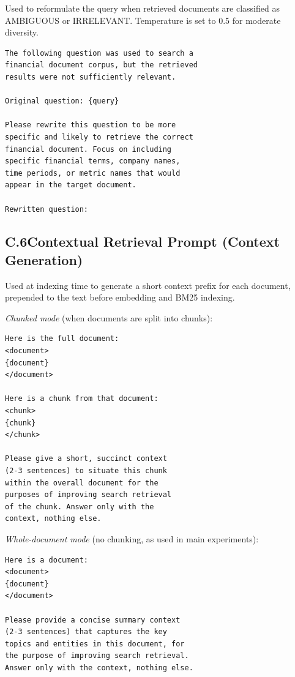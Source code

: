 \documentclass[11pt]{article}
\begin{document}
Used to reformulate the query when retrieved documents are classified as AMBIGUOUS or IRRELEVANT. Temperature is set to 0.5 for moderate diversity.

\begin{scriptsize}
\begin{verbatim}
The following question was used to search a
financial document corpus, but the retrieved
results were not sufficiently relevant.

Original question: {query}

Please rewrite this question to be more
specific and likely to retrieve the correct
financial document. Focus on including
specific financial terms, company names,
time periods, or metric names that would
appear in the target document.

Rewritten question:
\end{verbatim}
\end{scriptsize}

\subsection*{C.6\quad Contextual Retrieval Prompt (Context Generation)}

Used at indexing time to generate a short context prefix for each document, prepended to the text before embedding and BM25 indexing.

\noindent\textit{Chunked mode} (when documents are split into chunks):

\begin{scriptsize}
\begin{verbatim}
Here is the full document:
<document>
{document}
</document>

Here is a chunk from that document:
<chunk>
{chunk}
</chunk>

Please give a short, succinct context
(2-3 sentences) to situate this chunk
within the overall document for the
purposes of improving search retrieval
of the chunk. Answer only with the
context, nothing else.
\end{verbatim}
\end{scriptsize}

\noindent\textit{Whole-document mode} (no chunking, as used in main experiments):

\begin{scriptsize}
\begin{verbatim}
Here is a document:
<document>
{document}
</document>

Please provide a concise summary context
(2-3 sentences) that captures the key
topics and entities in this document, for
the purpose of improving search retrieval.
Answer only with the context, nothing else.
\end{verbatim}
\end{scriptsize}
\end{document}
